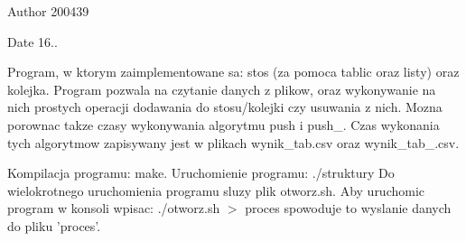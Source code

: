 \begin{DoxyAuthor}{\-Author}
200439 
\end{DoxyAuthor}
\begin{DoxyDate}{\-Date}
16..
\end{DoxyDate}
\-Program, w ktorym zaimplementowane sa\-: stos (za pomoca tablic oraz listy) oraz kolejka. \-Program pozwala na czytanie danych z plikow, oraz wykonywanie na nich prostych operacji dodawania do stosu/kolejki czy usuwania z nich. \-Mozna porownac takze czasy wykonywania algorytmu push i push\-\_. \-Czas wykonania tych algorytmow zapisywany jest w plikach wynik\-\_\-tab.\-csv oraz wynik\-\_\-tab\-\_.\-csv.

\-Kompilacja programu\-: make. \-Uruchomienie programu\-: ./struktury \-Do wielokrotnego uruchomienia programu sluzy plik otworz.\-sh. \-Aby uruchomic program w konsoli wpisac\-: ./otworz.sh $>$ proces spowoduje to wyslanie danych do pliku 'proces'. 